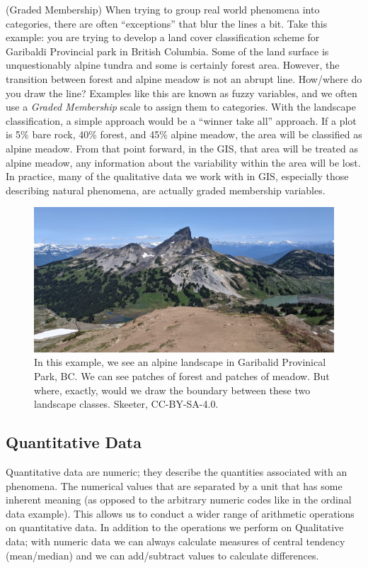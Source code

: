 \documentclass[
]{book}
\begin{document}
(Graded Membership) When trying to group real world phenomena into categories, there are often ``exceptions'' that blur the lines a bit. Take this example: you are trying to develop a land cover classification scheme for Garibaldi Provincial park in British Columbia. Some of the land surface is unquestionably alpine tundra and some is certainly forest area. However, the transition between forest and alpine meadow is not an abrupt line. How/where do you draw the line? Examples like this are known as fuzzy variables, and we often use a \emph{Graded Membership} scale to assign them to categories. With the landscape classification, a simple approach would be a ``winner take all'' approach. If a plot is 5\% bare rock, 40\% forest, and 45\% alpine meadow, the area will be classified as alpine meadow. From that point forward, in the GIS, that area will be treated as alpine meadow, any information about the variability within the area will be lost. In practice, many of the qualitative data we work with in GIS, especially those describing natural phenomena, are actually graded membership variables.

\begin{figure}
\includegraphics[width=0.75\linewidth]{images/03-fuzzy} \caption{In this example, we see an alpine landscape in Garibalid Provinical Park, BC.  We can see patches of forest and patches of meadow.  But where, exactly, would we draw the boundary between these two landscape classes. Skeeter, CC-BY-SA-4.0.}\label{fig:3-fuzzy}
\end{figure}

\subsection{Quantitative Data}\label{quantitative-data}

Quantitative data are numeric; they describe the quantities associated with an phenomena. The numerical values that are separated by a unit that has some inherent meaning (as opposed to the arbitrary numeric codes like in the ordinal data example). This allows us to conduct a wider range of arithmetic operations on quantitative data. In addition to the operations we perform on Qualitative data; with numeric data we can always calculate measures of central tendency (mean/median) and we can add/subtract values to calculate differences.
\end{document}
